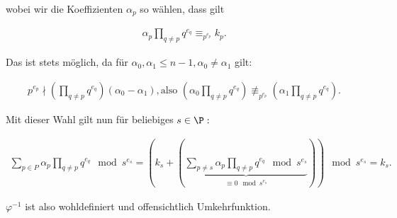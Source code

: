 \begin{solution}
wobei wir die Koeffizienten $\alpha_p$ so wählen, dass gilt

\begin{align}
    \alpha_p \prod_{q \neq p} q^{e_q} \equiv_{p^{e_{p}}} k_{p}.
\end{align}

Das ist stets möglich, da für $\alpha_0, \alpha_1 \leq n-1, \alpha_0 \neq \alpha_1$ gilt:

\begin{align}
    p^{e_{p}} \nmid \left(\prod_{q \neq p} q^{e_q}\right) (\alpha_0 - \alpha_1), \text{also~}
    \left(\alpha_0 \prod_{q \neq p} q^{e_q}\right) \not\equiv_{p^{e_p}}
    \left(\alpha_1 \prod_{q \neq p} q^{e_q}\right).
\end{align}

Mit dieser Wahl gilt nun für beliebiges $s \in \P:$

\begin{align}
\sum_{p \in P} \alpha_p \prod_{q \neq p} q^{e_q} \mod s^{e_s} =
\left(k_s + \left(\underbrace{\sum_{p \neq s} \alpha_p \prod_{q \neq p} q^{e_q}
\mod s^{e_s}}_{\substack{\equiv 0 \mod s^{e_s}}}\right)\right) \mod s^{e_s} = k_s.
\end{align}

$\varphi^{-1}$ ist also wohldefiniert und offensichtlich Umkehrfunktion.
\end{solution}

